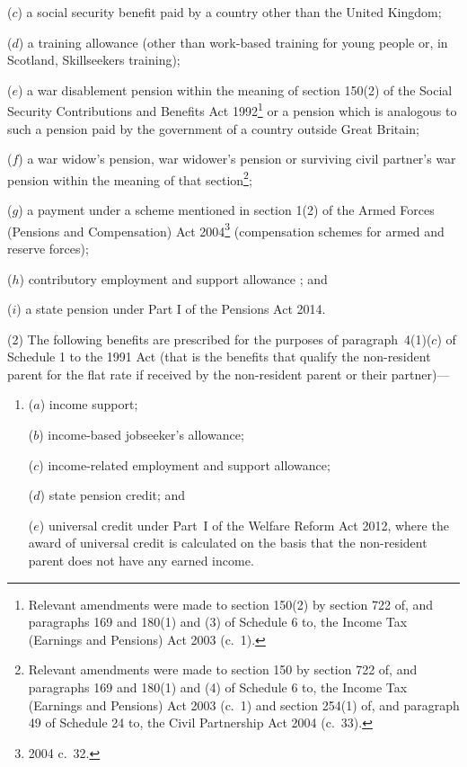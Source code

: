 \documentclass[12pt,a4paper]{article}
\begin{document}
\begin{enumerate}
($c$) a social security benefit paid by a country other than the United Kingdom;

($d$) a training allowance (other than work-based training for young people or, in Scotland, Skillseekers training);

($e$) a war disablement pension within the meaning of section 150(2) of the Social Security Contributions and Benefits Act 1992\footnote{Relevant amendments were made to section 150(2) by section 722 of, and paragraphs 169 and 180(1) and (3) of Schedule 6 to, the Income Tax (Earnings and Pensions) Act 2003 (c.~1).} or a pension which is analogous to such a pension paid by the government of a country outside Great Britain;

($f$) a war widow’s pension, war widower’s pension or surviving civil partner’s war pension within the meaning of that section\footnote{Relevant amendments were made to section 150 by section 722 of, and paragraphs 169 and 180(1) and (4) of Schedule 6 to, the Income Tax (Earnings and Pensions) Act 2003 (c.~1) and section 254(1) of, and paragraph 49 of Schedule 24 to, the Civil Partnership Act 2004 (c.~33).};

($g$) a payment under a scheme mentioned in section 1(2) of the Armed Forces (Pensions and Compensation) Act 2004\footnote{2004 c.~32.} (compensation schemes for armed and reserve forces); 

($h$) contributory employment and support allowance%
%
; and

($i$) a state pension under Part I of the Pensions Act 2014.
\end{enumerate}

\begin{sloppypar}
(2) The following benefits are prescribed for the purposes of paragraph~4(1)($c$)  of Schedule 1 to the 1991 Act (that is the benefits that qualify the non-resident parent for the flat rate if received by the non-resident parent or their partner)—
\end{sloppypar}
\begin{enumerate}\item[]
($a$) income support;

($b$) income-based jobseeker’s allowance;

($c$) income-related employment and support allowance; 

($d$) state pension credit;
%
and

($e$) universal credit under Part~I of the Welfare Reform Act 2012, where the award of universal credit is calculated on the basis that the non-resident parent does not have any earned income.
\end{enumerate}
\end{document}
